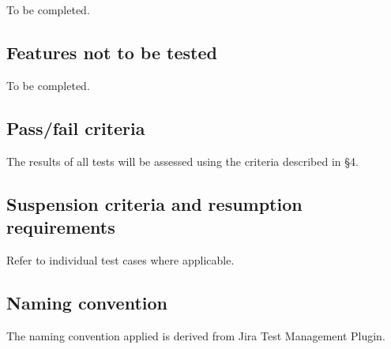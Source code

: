 \documentclass[DM,lsstdraft,STS,toc]{lsstdoc}
\begin{document}
To be completed.

\subsection{Features not to be tested}
\label{sec:featnot2test}

To be completed.

\subsection{Pass/fail criteria}
\label{sec:passfail}

The results of all tests will be assessed using the criteria described in
 \S4.


\subsection{Suspension criteria and resumption requirements}
\label{suspension}

Refer to individual test cases where applicable.

\subsection{Naming convention}

The naming convention applied is derived from Jira Test Management Plugin.

\newpage

\end{document}
